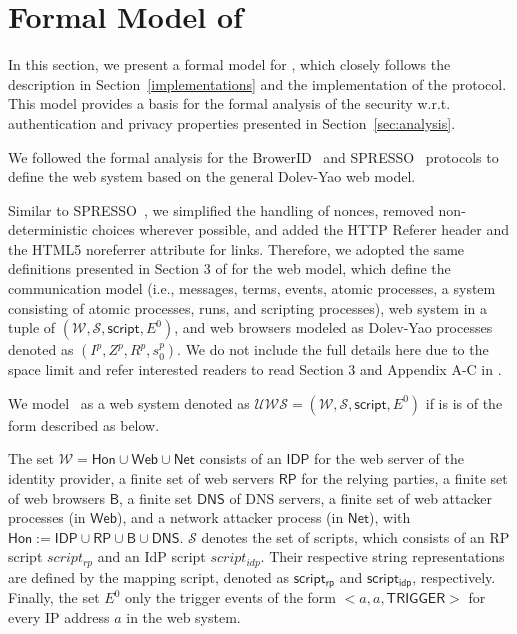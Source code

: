 \appendix

\section{Formal Model of \usso}
\label{appendix-model}

In this section, we present a formal model for \usso, which closely follows the description in Section~\ref{implementations} and the implementation of the protocol. This model provides a basis for the formal analysis of the security w.r.t. authentication and privacy properties presented in Section~\ref{sec:analysis}.

\vspace{1mm}  We followed the formal analysis for the BrowerID~\cite{BrowserID} and SPRESSO~\cite{SPRESSO} protocols to define the web system based on the general Dolev-Yao web model. 

Similar to SPRESSO~\cite{SPRESSO}, we simplified the handling of nonces, removed non-deterministic choices wherever possible, and added the HTTP Referer header and the HTML5 noreferrer attribute for links. Therefore, we adopted the same definitions presented in Section 3 of \cite{SPRESSO} for the web model, which define the communication model (i.e., messages, terms, events, atomic processes, a system consisting of atomic processes, runs, and scripting processes), web system in a tuple of $(\mathcal{W}, \mathcal{S}, \mathsf{script}, E^0)$, and web browsers modeled as Dolev-Yao processes denoted as $(I^p, Z^p, R^p, s_0^p)$. We do not include the full details here due to the space limit and refer interested readers to read Section 3 and Appendix A-C in \cite{SPRESSO}.

\vspace{1mm}  We model \usso\ as a web system denoted as $\mathcal{UWS}=(\mathcal{W}, \mathcal{S}, \mathsf{script}, E^0)$ if is is of the form described as below.

The set $\mathcal{W} = \mathsf{Hon} \cup \mathsf{Web} \cup \mathsf{Net}$ consists of an $\mathsf{IDP}$ for the web server of the identity provider, a finite set of web servers $\mathsf{RP}$ for the relying parties, 
a finite set of web browsers $\mathsf{B}$, a finite set $\mathsf{DNS}$ of DNS servers, a finite set of web attacker processes (in $\mathsf{Web}$), and a network attacker process (in $\mathsf{Net}$), with $\mathsf{Hon}:=\mathsf{IDP}\cup\mathsf{RP}\cup\mathsf{B}\cup\mathsf{DNS}$. $\mathcal{S}$ denotes the set of scripts, which consists of an RP script $script_{rp}$ and an IdP script $script_{idp}$. Their respective string representations are defined by the mapping script, denoted as $\mathsf{script_{rp}}$ and $\mathsf{script_{idp}}$, respectively. Finally, the set $E^0$ only the trigger events of the form $<a,a,\mathsf{TRIGGER}>$ for every IP address $a$ in the web system.

